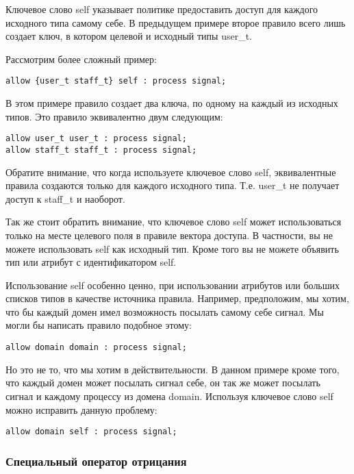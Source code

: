 \documentclass{./../class/UIR}
\begin{document}
Ключевое слово self указывает политике предоставить доступ для каждого исходного
типа самому себе. В предыдущем примере второе правило всего лишь создает ключ, в
котором целевой и исходный типы user\_t.

Рассмотрим более сложный пример:

\begin{verbatim}
allow {user_t staff_t} self : process signal;
\end{verbatim}

В этом примере правило создает два ключа, по одному на каждый из исходных типов.
Это правило эквивалентно двум следующим:

\begin{verbatim}
allow user_t user_t : process signal;
allow staff_t staff_t : process signal;
\end{verbatim}

Обратите внимание, что когда используете ключевое слово self, эквивалентные
правила создаются только для каждого исходного типа. Т.е. user\_t не получает
доступ к staff\_t и наоборот.

Так же стоит обратить внимание, что ключевое слово self может использоваться
только на месте целевого поля в правиле вектора доступа. В частности, вы не
можете использовать self как исходный тип.  Кроме того вы не можете объявить тип
или атрибут с идентификатором self.

Использование self особенно ценно, при использовании атрибутов или больших
списков типов в качестве источника правила. Например, предположим, мы хотим, что
бы каждый домен имел возможность посылать самому себе сигнал. Мы могли бы
написать правило подобное этому:

\begin{verbatim}
allow domain domain : process signal;
\end{verbatim}

Но это не то, что мы хотим в действительности. В данном примере кроме того, что
каждый домен может посылать сигнал себе, он так же может посылать сигнал и
каждому процессу из домена domain. Используя ключевое слово self можно исправить
данную проблему:

\begin{verbatim}
allow domain self : process signal;
\end{verbatim}

\subsubsection{Специальный оператор отрицания}
\end{document}
